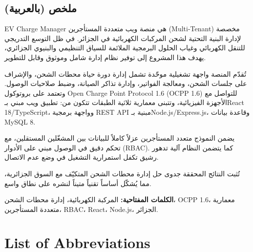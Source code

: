 \documentclass[12pt,a4paper]{report}
\newcommand{\lr}[1]{\textenglish{#1}}
\begin{document}
\bigskip
\begin{Arabic}
\section*{ملخص (بالعربية)}

\lr{EV Charge Manager} هي منصة ويب متعددة المستأجرين (\lr{Multi-Tenant}) مخصصة لإدارة
البنية التحتية لشحن المركبات الكهربائية في الجزائر. في ظل التوسع التدريجي للتنقل الكهربائي
وغياب الحلول البرمجية الملائمة للسياق التنظيمي والبنيوي الجزائري، يهدف هذا المشروع إلى
توفير نظام إدارة شامل وموثوق وقابل للتطوير.

تُقدّم المنصة واجهة تشغيلية موحّدة تشمل إدارة دورة حياة محطات الشحن، والإشراف على جلسات
الشحن، ومعالجة الفواتير، وإدارة تذاكر الصيانة، وضبط صلاحيات الوصول. وتعتمد على بروتوكول
\lr{Open Charge Point Protocol 1.6 (OCPP 1.6)} للتواصل مع الأجهزة الفيزيائية، وتتبنى
معمارية ثلاثية الطبقات تتكون من: تطبيق ويب مبني بـ\lr{React 18/TypeScript}، وواجهة برمجية
\lr{REST API} مبنية بـ\lr{Node.js/Express.js}، وقاعدة بيانات \lr{MySQL 8}.

يضمن النموذج متعدد المستأجرين عزلاً كاملاً للبيانات بين المشغّلين المستقلين، مع تحكم دقيق
في الوصول مبني على الأدوار (\lr{RBAC}). كما يتضمن النظام آلية تدهور رشيق تكفل استمرارية
التشغيل في وضع عدم الاتصال.

تُثبت النتائج المحققة جدوى حل إدارة محطات الشحن المتكيّف مع السوق الجزائرية، مما يُشكّل
أساساً تقنياً متيناً لنشره على نطاق واسع.

\medskip
\noindent\textbf{الكلمات المفتاحية:} المركبة الكهربائية، إدارة محطات الشحن،
\lr{OCPP 1.6}، معمارية متعددة المستأجرين، \lr{RBAC}، \lr{React}، \lr{Node.js}، الجزائر.
\end{Arabic}

\tableofcontents
\listoffigures
\listoftables

\chapter*{List of Abbreviations}
\end{document}
